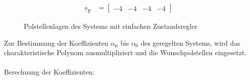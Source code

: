 \begin{align}\label{eq:Gleichung37}
    \underline{s}_{\mathrm{P}} &= 
    \begin{bmatrix}
        -4 & -4 & -4 & -4 
    \end{bmatrix}
\end{align}

\begin{figure}[H]
    \centering
    \caption[Polstellenlage einfacher Zustandsregler]{Polstellenlagen des Systems mit einfachen Zustandsregler}
    \label{fig:Bild8}
\end{figure}

Zur Bestimmung der Koeffizienten $\alpha_{\mathrm{n}}$ bis $\alpha_{\mathrm{0}}$ des geregelten Systems, wird das charakteristische Polynom ausmultipliziert und die Wunschpolstellen eingesetzt.\\\\
Berechnung der Koeffizienten:

